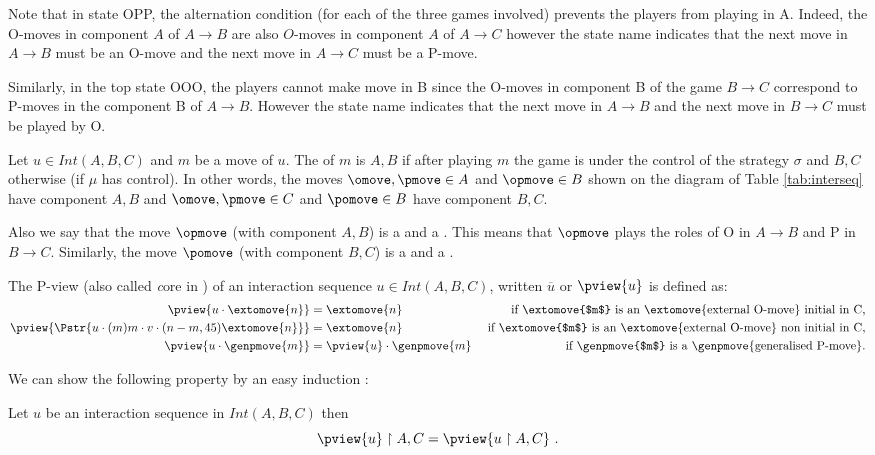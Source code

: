 Note that in state OPP, the alternation condition (for each of the three games involved) prevents the players from playing in A. Indeed, the O-moves in component $A$ of $A\rightarrow B$ are also $O$-moves in component $A$ of $A\rightarrow C$ however the state name indicates that the next move in $A\rightarrow B$ must be an O-move and the next move in $A\rightarrow C$ must be a P-move.

Similarly, in the top state OOO, the players cannot make move in B since the O-moves in component B of the game $B\rightarrow C$ correspond to P-moves in the component B of $A\rightarrow B$. However the state name indicates that the next move in $A\rightarrow B$ and the next move in $B\rightarrow C$ must be played by O.


Let $u \in Int(A,B,C)$ and $m$ be a move of $u$.
The  of $m$ is $A,B$ if 
after playing $m$ the game is under the control 
of the strategy $\sigma$ and $B,C$ otherwise (if $\mu$ has control).
In other words, the moves $\omove, \pmove \in A$
and $\opmove \in B$ shown on the diagram of Table \ref{tab:interseq}
have component $A,B$ and 
$\omove, \pmove \in C$ and $\pomove \in B$
have component $B,C$.


Also we say that the move $\opmove$ (with component $A,B$)
is a 
and a .
This means that $\opmove$  plays the roles of O in  $A\rightarrow B$ and P in 
$B\rightarrow C$.
Similarly, the move $\pomove$ (with component $B,C$)
is a 
and a .


The P-view (also called {\emph core} in \cite{McCusker-GamesandFullAbstrac}) of an interaction sequence $u \in Int(A,B,C)$, written $\overline{u}$ or $\pview{u}$ is defined as:
\begin{align*}
\pview{u\cdot \extomove{n}} &= \extomove{n} &
\mbox{ if \extomove{$m$} is an \extomove{external O-move} initial in C,}\\
\pview{\Pstr{u\cdot (m)m\cdot v \cdot (n-m,45){\extomove{n}} }} &= \extomove{n} &\mbox{ if \extomove{$m$} is an \extomove{external O-move} non initial in C,}\\
\pview{u \cdot \genpmove{m}} &= \pview{u}\cdot \genpmove{m}  & \mbox{ if \genpmove{$m$} is a \genpmove{generalised P-move}.}\\ 
\end{align*}

We can show the following property by an easy induction :
\begin{lemma}
\label{lem:interaction_projection}
 Let $u$ be an interaction sequence in $Int(A,B,C)$ then
$$\pview{u} \upharpoonright A,C = \pview{u \upharpoonright A,C} \ .$$
\end{lemma}

